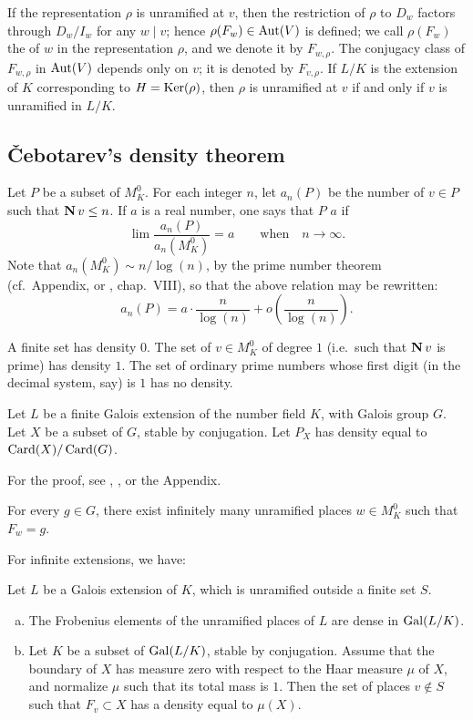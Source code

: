 If the representation $\rho$ is unramified at $v$, then the
\dpage
restriction of $\rho$ to $D_w$ factors through $D_w/I_w$ for any $w\mid v$;
hence $\rho(F_w) \in \operatorname{Aut}(V)$ is defined; we call $\rho(F_w)$ the
 of $w$ in the representation $\rho$, and we denote it by
$F_{w, \rho}$. The conjugacy class of $F_{w, \rho}$ in $\operatorname{Aut}(V)$ depends only
on $v$; it is denoted by $F_{v, \rho}$. If $L/K$ is the extension of $K$
corresponding to $H = \operatorname{Ker}(\rho)$, then $\rho$ is unramified at $v$ if and only
if $v$ is unramified in $L/K$.

\subsection{\v Cebotarev's density theorem}
Let $P$ be a subset of $M_K^0$. For each integer $n$, let $a_n(P)$
be the number of $v \in P$ such that $\operatorname{\mathbf{N}} v \le n$. If $a$ is a real number,
one says that $P$  $a$ if
\[
	\lim \frac{a_n(P)}{a_n(M_K^0)} = a \qquad \text{when}\quad n \to \infty.
\]
Note that $a_n(M_K^0) \sim n/\log(n)$, by the prime number theorem (cf.\
Appendix, or \cite{13}, chap.~VIII), so that the above relation may be
rewritten:
\[
	a_n(P) = a \cdot \frac{n}{\log(n)} + o \left(\frac{n}{\log(n)}\right).
\]
\begin{ex}
A finite set has density $0$. The set of $v \in M_K^0$ of degree $1$ (i.e.\ such
that $\operatorname{\mathbf{N}} v$ is prime) has density $1$. The set of ordinary prime numbers
whose first digit (in the decimal system, say) is $1$ has no density.
\end{ex}

\begin{thm}
Let $L$ be a finite Galois extension of the number field $K$, with Galois group
$G$. Let $X$ be a subset of $G$, stable by
\dpage
conjugation. Let $P_X$ has density equal to $\operatorname{Card}(X)/\operatorname{Card}(G)$. 
\end{thm}
For the proof, see \cite{7}, \cite{1}, or the Appendix.

\begin{cor}
For every $g \in G$, there exist infinitely many unramified places $w \in
M_K^0$ such that $F_w = g$.
\end{cor}

For infinite extensions, we have:
\begin{cor}
Let $L$ be a Galois extension of $K$, which is unramified outside a finite set
$S$.
\begin{enumerate}[a)]
\item The Frobenius elements of the unramified places of $L$ are dense in
	$\operatorname{Gal}(L/K)$.
\item Let $K$ be a subset of $\operatorname{Gal}(L/K)$, stable by conjugation. Assume that
	the boundary of $X$ has measure zero with respect to the Haar measure
	$\mu$ of $X$, and normalize $\mu$ such that its total mass is $1$. Then
	the set of places $v \not\in S$ such that $F_v \subset X$ has a density
	equal to $\mu(X)$.
\end{enumerate}
\end{cor}

